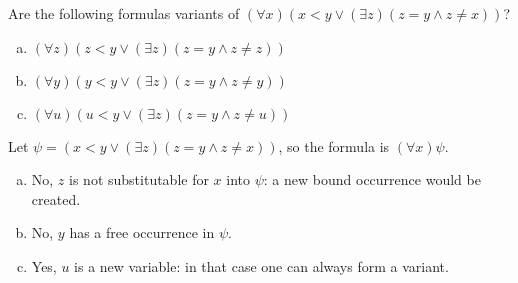 \begin{problem}
    
    Are the following formulas variants of $(\forall x)(x<y \vee (\exists z)(z=y \wedge z\ne x))$?
    \begin{enumerate}[(a)]
        \item $(\forall z)(z<y \vee (\exists z)(z=y \wedge z\ne z))$
        \item $(\forall y)(y<y \vee (\exists z)(z=y \wedge z\ne y))$
        \item $(\forall u)(u<y \vee (\exists z)(z=y \wedge z\ne u))$
    \end{enumerate}

    \begin{solution}
        Let $\psi=(x<y \vee (\exists z)(z=y \wedge z\ne x))$, so the formula is $(\forall x)\psi$.

        \begin{enumerate}[(a)]
            \item No, $z$ is not substitutable for $x$ into $\psi$: a new bound occurrence would be created.
            \item No, $y$ has a free occurrence in $\psi$.
            \item Yes, $u$ is a new variable: in that case one can always form a variant.
        \end{enumerate}        
        
    \end{solution}

\end{problem}


